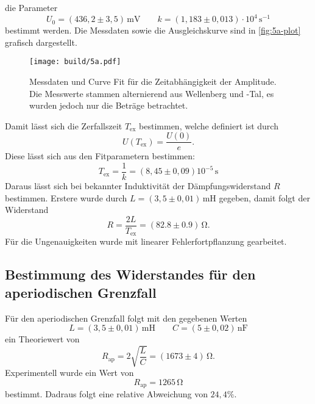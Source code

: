 die Parameter
\begin{equation}
	U_0 = (436,2 \pm 3,5) \, \si{\milli\volt}
	\qquad
	k = (1,183 \pm 0,013) \cdot 10^4 \, \si{\second^{-1}}
\end{equation}
bestimmt werden. Die Messdaten sowie die Ausgleichskurve sind in \autoref{fig:5a-plot}
grafisch dargestellt.
\begin{figure}[H]
	\centering
	\texttt{[image: build/5a.pdf]}
	\caption{Messdaten und Curve Fit für die Zeitabhängigkeit der Amplitude. Die
		Messwerte stammen alternierend aus Wellenberg und -Tal, es wurden jedoch
	nur die Beträge betrachtet.}
	\label{fig:5a-plot}
\end{figure}
Damit lässt sich die Zerfallszeit $T_\text{ex}$ bestimmen, welche definiert ist durch
\begin{equation}
	U\left( T_\text{ex} \right) = \frac{U(0)}{e}.
\end{equation}
Diese lässt sich aus den Fitparametern bestimmen:
\begin{equation}
	T_\text{ex} = \frac{1}{k} = (8,45 \pm 0,09)10^{-5} \, \si{\second}
\end{equation}
Daraus lässt sich bei bekannter Induktivität der Dämpfungswiderstand $R$ bestimmen.
Erstere wurde durch $L = (3,5 \pm 0,01) \, \si{\milli\henry}$ gegeben, damit folgt der
Widerstand
\begin{equation}
	R = \frac{2L}{T_\text{ex}} = (82.8 \pm 0.9) \, \si{\ohm}.
\end{equation}
Für die Ungenauigkeiten wurde mit linearer Fehlerfortpflanzung gearbeitet.

\subsection{Bestimmung des Widerstandes für den aperiodischen Grenzfall}
\label{sec:Bestimmung des Widerstandes für den Aperiodischen Grenzfall}
Für den aperiodischen Grenzfall folgt mit den gegebenen Werten
\begin{equation}
	L = (3,5 \pm 0,01) \, \si{\milli\henry}
	\qquad
	C = (5 \pm 0,02) \, \si{\nano\farad}
\end{equation}
ein Theoriewert von
\begin{equation}
	R_\text{ap} = 2 \sqrt{\frac{L}{C}} = (1673 \pm 4) \, \si{\ohm}.
\end{equation}
Experimentell wurde ein Wert von
\begin{equation}
	R_\text{ap} = 1265 \, \si{\ohm}
\end{equation}
bestimmt. Dadraus folgt eine relative Abweichung von $24,4 \%$.

